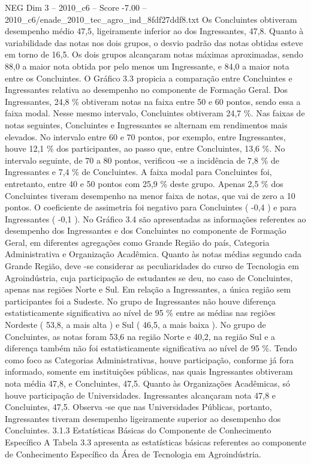\begin{textsample}{NEG Dim 3 – 2010\_c6 – Score -7.00 – 2010\_c6/enade\_2010\_tec\_agro\_ind\_8fdf27ddf8.txt}
Os Concluintes obtiveram desempenho médio 47,5, ligeiramente inferior ao dos Ingressantes, 47,8.
Quanto à variabilidade das notas nos dois grupos, o desvio padrão das notas obtidas esteve em torno de 16,5.
Os dois grupos alcançaram notas máximas aproximadas, sendo 88,0 a maior nota obtida por pelo menos um Ingressante, e 84,0 a maior nota entre os Concluintes.
O Gráfico 3.3 propicia a comparação entre Concluintes e Ingressantes relativa ao desempenho no componente de Formação Geral.
Dos Ingressantes, 24,8 \% obtiveram notas na faixa entre 50 e 60 pontos, sendo essa a faixa modal.
Nesse mesmo intervalo, Concluintes obtiveram 24,7 \%.
Nas faixas de notas seguintes, Concluintes e Ingressantes se alternam em rendimentos mais elevados.
No intervalo entre 60 e 70 pontos, por exemplo, entre Ingressantes, houve 12,1 \% dos participantes, ao passo que, entre Concluintes, 13,6 \%.
No intervalo seguinte, de 70 a 80 pontos, verificou -se a incidência de 7,8 \% de Ingressantes e 7,4 \% de Concluintes.
A faixa modal para Concluintes foi, entretanto, entre 40 e 50 pontos com 25,9 \% deste grupo.
Apenas 2,5 \% dos Concluintes tiveram desempenho na menor faixa de notas, que vai de zero a 10 pontos.
O coeficiente de assimetria foi negativo para Concluintes ( -0,4 ) e para Ingressantes ( -0,1 ).
No Gráfico 3.4 são apresentadas as informações referentes ao desempenho dos Ingressantes e dos Concluintes no componente de Formação Geral, em diferentes agregações como Grande Região do país, Categoria Administrativa e Organização Acadêmica.
Quanto às notas médias segundo cada Grande Região, deve -se considerar as peculiaridades do curso de Tecnologia em Agroindústria, cuja participação de estudantes se deu, no caso de Concluintes, apenas nas regiões Norte e Sul.
Em relação a Ingressantes, a única região sem participantes foi a Sudeste.
No grupo de Ingressantes não houve diferença estatisticamente significativa ao nível de 95 \% entre as médias nas regiões Nordeste ( 53,8, a mais alta ) e Sul ( 46,5, a mais baixa ).
No grupo de Concluintes, as notas foram 53,6 na região Norte e 40,2, na região Sul e a diferença também não foi estatisticamente significativa ao nível de 95 \%.
Tendo como foco as Categorias Administrativas, houve participação, conforme já fora informado, somente em instituições públicas, nas quais Ingressantes obtiveram nota média 47,8, e Concluintes, 47,5.
Quanto às Organizações Acadêmicas, só houve participação de Universidades.
Ingressantes alcançaram nota 47,8 e Concluintes, 47,5.
Observa -se que nas Universidades Públicas, portanto, Ingressantes tiveram desempenho ligeiramente superior ao desempenho dos Concluintes. 3.1.3 Estatísticas Básicas do Componente de Conhecimento Específico A Tabela 3.3 apresenta as estatísticas básicas referentes ao componente de Conhecimento Específico da Área de Tecnologia em Agroindústria.

\end{textsample}
